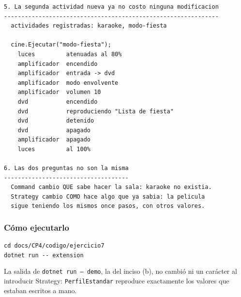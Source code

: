 {\begin{verbatim}
5. La segunda actividad nueva ya no costo ninguna modificacion
--------------------------------------------------------------
  actividades registradas: karaoke, modo-fiesta

  cine.Ejecutar("modo-fiesta");
    luces         atenuadas al 80%
    amplificador  encendido
    amplificador  entrada -> dvd
    amplificador  modo envolvente
    amplificador  volumen 10
    dvd           encendido
    dvd           reproduciendo "Lista de fiesta"
    dvd           detenido
    dvd           apagado
    amplificador  apagado
    luces         al 100%

6. Las dos preguntas no son la misma
------------------------------------
  Command cambio QUE sabe hacer la sala: karaoke no existia.
  Strategy cambio COMO hace algo que ya sabia: la pelicula
  sigue teniendo los mismos once pasos, con otros valores.
\end{verbatim}
}

\subsubsection*{Cómo ejecutarlo}

{\small
\begin{verbatim}
cd docs/CP4/codigo/ejercicio7
dotnet run -- extension
\end{verbatim}
}

La salida de \texttt{dotnet run -- demo}, la del inciso (b), no cambió ni un carácter al
introducir Strategy: \texttt{PerfilEstandar} reproduce exactamente los valores que estaban
escritos a mano.

\fussy
